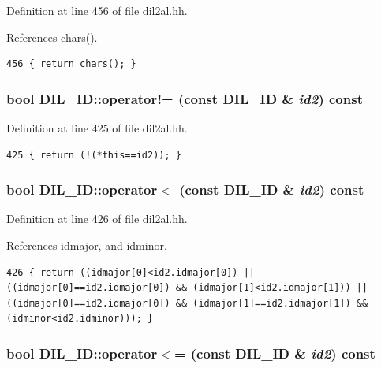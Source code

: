 Definition at line 456 of file dil2al.hh.

References chars().



\footnotesize\begin{verbatim}456 { return chars(); }
\end{verbatim}\normalsize 
{}
\subsubsection{\setlength{\rightskip}{0pt plus 5cm}bool DIL\_\-ID::operator!= (const DIL\_\-ID \& {\em id2}) const\hspace{0.3cm}{\tt  [inline]}}\label{classDIL__ID_a7}




Definition at line 425 of file dil2al.hh.



\footnotesize\begin{verbatim}425 { return (!(*this==id2)); }
\end{verbatim}\normalsize 
{}
\subsubsection{\setlength{\rightskip}{0pt plus 5cm}bool DIL\_\-ID::operator$<$ (const DIL\_\-ID \& {\em id2}) const\hspace{0.3cm}{\tt  [inline]}}\label{classDIL__ID_a8}




Definition at line 426 of file dil2al.hh.

References idmajor, and idminor.



\footnotesize\begin{verbatim}426 { return ((idmajor[0]<id2.idmajor[0]) || ((idmajor[0]==id2.idmajor[0]) && (idmajor[1]<id2.idmajor[1])) || ((idmajor[0]==id2.idmajor[0]) && (idmajor[1]==id2.idmajor[1]) && (idminor<id2.idminor))); }
\end{verbatim}\normalsize 
{}
\subsubsection{\setlength{\rightskip}{0pt plus 5cm}bool DIL\_\-ID::operator$<$= (const DIL\_\-ID \& {\em id2}) const\hspace{0.3cm}{\tt  [inline]}}\label{classDIL__ID_a9}




